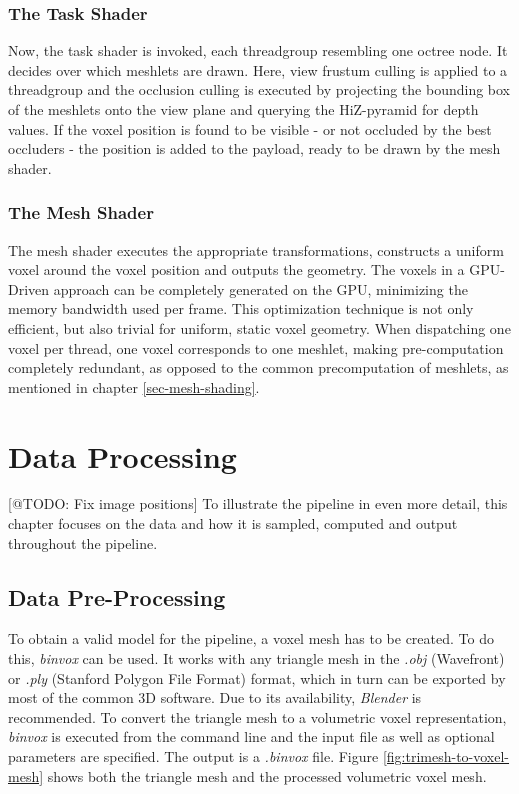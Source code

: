 \subsubsection*{The Task Shader} \label{subsec-task-shader}

Now, the task shader is invoked, each threadgroup resembling one octree node. It decides over which 
meshlets are drawn. Here, view frustum culling is applied to a threadgroup and the occlusion culling is 
executed by projecting the bounding box of the meshlets onto the view plane and querying the 
\ac{HiZ}-pyramid for depth values. If the voxel position is found to be visible - or not occluded by 
the best occluders - the position is added to the payload, ready to be drawn by the mesh shader. 


\subsubsection*{The Mesh Shader} \label{subsec-mesh-shader}

The mesh shader executes the appropriate transformations, constructs a uniform voxel around the voxel position 
and outputs the geometry. The voxels in a \ac{GPU}-Driven approach can be completely generated on the \ac{GPU}, 
minimizing the memory bandwidth used per frame. This optimization technique is not only efficient, but also 
trivial for uniform, static voxel geometry. When dispatching one voxel per thread, one voxel corresponds 
to one meshlet, making pre-computation completely redundant, as opposed to the common precomputation of meshlets, 
as mentioned in chapter \ref{sec-mesh-shading}. 


\section{Data Processing} \label{sec-data-flow}

[@TODO: Fix image positions]
To illustrate the pipeline in even more detail, this chapter focuses on the data and how it is sampled, computed 
and output throughout the pipeline.

\subsection*{Data Pre-Processing}

To obtain a valid model for the pipeline, a voxel mesh has to be created. To do this, \emph{binvox} 
\cite{binvox} can be used. It works with any triangle mesh in the \emph{.obj} (Wavefront) or \emph{.ply} 
(Stanford Polygon File Format) format, which in turn can be exported by most of the common 3D software. 
Due to its availability, \emph{Blender} \cite{Blender} is recommended. To convert the triangle mesh to a volumetric 
voxel representation, \emph{binvox} is executed from the command line and the input file as well as optional 
parameters are specified. The output is a \emph{.binvox} file. Figure \ref{fig:trimesh-to-voxel-mesh} shows 
both the triangle mesh and the processed volumetric voxel mesh. 

